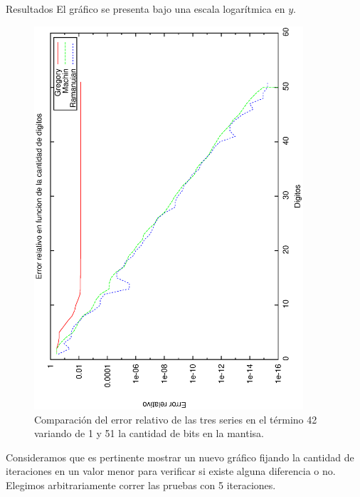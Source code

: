 \begin{section}{Resultados}
	El gráfico se presenta bajo una escala logarítmica en $y$.
	
	\begin{figure}[H]
	  \centering
		\includegraphics[width=10cm,angle=-90]{graficos/comparacion_42it_1a51p.eps}
	  \caption{Comparación del error relativo de las tres series en el término 42 variando de 1 y 51 la cantidad de bits en la mantisa.}
	  \label{fig:42it}
	\end{figure}
	
	\VSP
	
	Consideramos que es pertinente mostrar un nuevo gráfico fijando la cantidad de iteraciones en un valor menor para verificar si existe alguna diferencia o no. Elegimos arbitrariamente correr las pruebas con 5 iteraciones.
	

\end{section}
